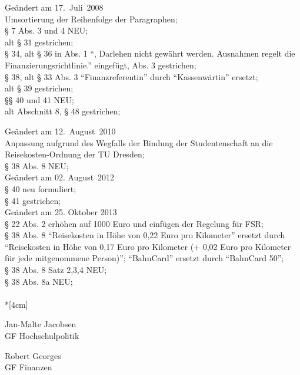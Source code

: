 Geändert am 17.~Juli~2008\\
Umsortierung der Reihenfolge der Paragraphen;\\
§ 7 Abs. 3 und 4 NEU;\\
alt § 31 gestrichen;\\
§ 34, alt § 36 in Abs. 1 "`, Darlehen nicht gewährt werden. Ausnahmen regelt die Finanzierungsrichtlinie."' eingefügt, Abs. 3 gestrichen;\\
§ 38, alt § 33 Abs. 3 "`Finanzreferentin"' durch "`Kassenwärtin"' ersetzt;\\
alt § 39 gestrichen;\\
§§ 40 und 41 NEU;\\
alt Abschnitt 8, § 48 gestrichen;

Geändert am 12.~August~2010\\
Anpassung aufgrund des Wegfalls der Bindung der Studentenschaft an die Reisekosten-Ordnung der TU Dresden;\\
§ 38 Abs. 8 NEU;\\

Geändert am 02. August~2012\\
§ 40 neu formuliert;\\
§ 41 gestrichen;\\

Geändert am 25. Oktober 2013\\
§ 22 Abs. 2 erhöhen auf 1000 Euro und einfügen der Regelung für FSR;\\
§ 38 Abs. 8 "`Reisekosten in Höhe von 0,22 Euro pro Kilometer"' ersetzt durch "`Reisekosten in Höhe von 0,17 Euro pro Kilometer (+ 0,02 Euro pro Kilometer für jede mitgenommene Person)"'; "`BahnCard"' ersetzt durch "`BahnCard 50"';\\
§ 38 Abs. 8 Satz 2,3,4 NEU;\\
§ 38 Abs. 8a NEU;\\

\normalsize
~\\*[4cm]
\begin{center}
\hspace*{\fill}
\parbox{7cm}{Jan-Malte Jacobsen\\GF Hochschulpolitik}
\hfill\parbox{7cm}{Robert Georges\\GF Finanzen}
\hspace*{\fill}
\end{center}
